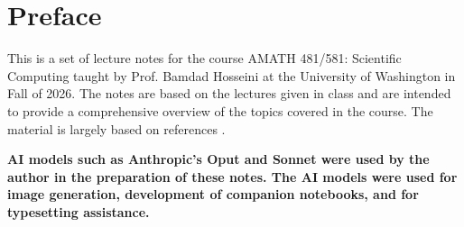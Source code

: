 \chapter*{Preface}

This is a set of lecture notes for the course AMATH 481/581: Scientific Computing taught by Prof. Bamdad Hosseini at the University of Washington in Fall of 2026. The notes are based on the lectures given in class and are intended to provide a comprehensive overview of the topics covered in the course.
The material is largely based on references \cite{ascher,edsberg, kutz}.
 
{\bf AI models such as Anthropic's Oput and Sonnet were used by 
the author in the preparation of these notes. The AI models were
used for image generation, development of companion notebooks, and 
for typesetting assistance.}



